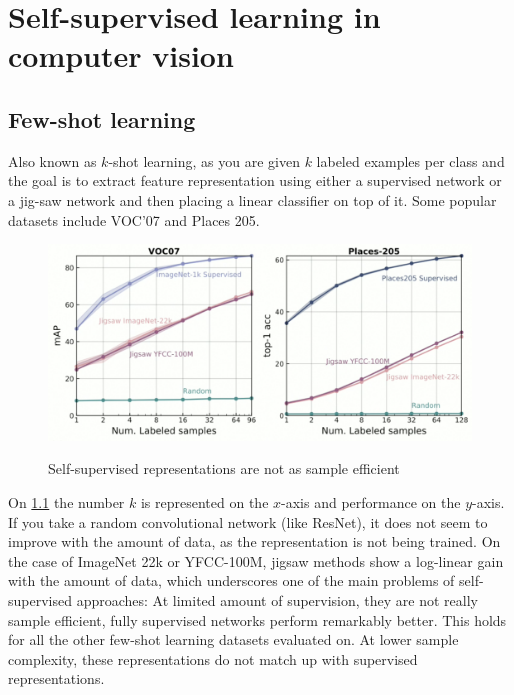 
\chapter{Self-supervised learning in computer vision}

\section{Few-shot learning}

Also known as $k$-shot learning, as you are given $k$ labeled examples per class and the goal is to extract feature representation using either a supervised network or a jig-saw network and then placing a linear classifier on top of it. Some popular datasets include VOC’07 and Places 205.

\begin{figure}[htb!]
\centering
\includegraphics[width=0.8\linewidth]{lectures/14-b/graphics/Self_supervised.png}
\label{fig:Self_supervised}
\caption{Self-supervised representations are not as sample efficient}
\end{figure}



On \ref{fig:Self_supervised} the number $k$ is represented on the $x$-axis and performance on the $y$-axis. If you take a random convolutional network (like ResNet), it does not seem to improve with the amount of data, as the representation is not being trained. On the case of ImageNet 22k or YFCC-100M, jigsaw methods show a log-linear gain with the amount of data, which underscores one of the main problems of self-supervised approaches: At limited amount of supervision, they are not really sample efficient, fully supervised networks perform remarkably better. This holds for all the other few-shot learning datasets evaluated on. At lower sample complexity, these representations do not match up with supervised representations.


